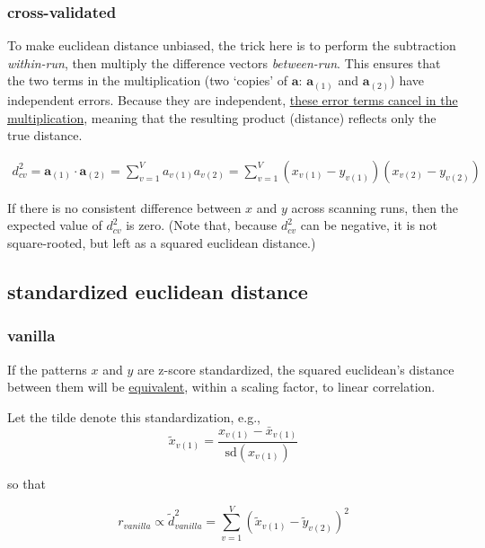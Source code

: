 \documentclass{article}\usepackage[]{graphicx}\usepackage[]{color}
\begin{document}
\subsubsection*{cross-validated}

To make euclidean distance unbiased, the trick here is to perform the subtraction \textit{within-run}, then multiply the difference vectors \textit{between-run}.
This ensures that the two terms in the multiplication (two `copies' of $\mathbf{a}$: $\mathbf{a}_{(1)}$ and $\mathbf{a}_{(2)}$) have independent errors.
Because they are independent, \href{https://doi.org/10.1016/j.neuroimage.2015.12.012}{these error terms cancel in the multiplication}, meaning that the resulting product (distance) reflects only the true distance.

\begin{align}
  d^2_\textit{cv} = \mathbf{a}_{(1)} \cdot \mathbf{a}_{(2)} = \sum_{v = 1}^V a_{v{(1)}}a_{v{(2)}} = \sum_{v = 1}^{V}(x_{v(1)} - y_{v(1)})(x_{v(2)} - y_{v(2)})
\end{align}

If there is no consistent difference between $x$ and $y$ across scanning runs, then the expected value of $d^2_\textit{cv}$ is zero.
(Note that, because $d^2_\textit{cv}$ can be negative, it is not square-rooted, but left as a squared euclidean distance.)


\subsection*{standardized euclidean distance}

\subsubsection*{vanilla}

If the patterns $x$ and $y$ are z-score standardized, the squared euclidean's distance between them will be \href{https://arxiv.org/abs/1601.02213}{equivalent}, within a scaling factor, to linear correlation.

Let the tilde denote this standardization, e.g.,
\[
\widetilde{x}_{v(1)} =
\frac{x_{v(1)} - \bar{x}_{v(1)}}
{\text{sd}(x_{v(1)})}
\]

so that

\begin{equation}
  r_\textit{vanilla} \propto \widetilde{d}^2_\textit{vanilla} = \sum_{v = 1}^{V}(\widetilde{x}_{v(1)} - \widetilde{y}_{v(2)})^2
\end{equation}
\end{document}
